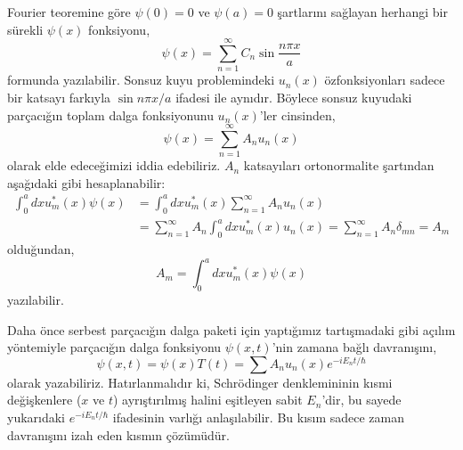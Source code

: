 \documentclass[a4paper,12pt, twoside]{article}
\begin{document}
Fourier teoremine göre $\psi ( 0 ) = 0$ ve $\psi ( a ) = 0$ şartlarını sağlayan herhangi bir sürekli $\psi ( x )$ fonksiyonu,
\begin{equation}
\psi ( x ) = \sum _ { n = 1 } ^ { \infty } C _ { n } \sin \frac { n \pi x } { a }
\end{equation}
formunda yazılabilir. Sonsuz kuyu problemindeki $u_n(x)$ özfonksiyonları sadece bir katsayı farkıyla $\sin n \pi x / a$ ifadesi ile aynıdır. Böylece sonsuz kuyudaki parçacığın toplam dalga fonksiyonunu $u_n(x)$'ler cinsinden,
\begin{equation}
\psi ( x ) = \sum _ { n = 1 } ^ { \infty } A _ { n } u _ { n } ( x )
\end{equation}
olarak elde edeceğimizi iddia edebiliriz. $A_n$ katsayıları ortonormalite şartından aşağıdaki gibi hesaplanabilir:
\begin{equation}
\begin{aligned} \int _ { 0 } ^ { a } d x u _ { m } ^ { * } ( x ) \psi ( x ) & = \int _ { 0 } ^ { a } d x u _ { m } ^ { * } ( x ) \sum _ { n = 1 } ^ { \infty } A _ { n } u _ { n } ( x ) \\ & = \sum _ { n = 1 } ^ { \infty } A _ { n } \int _ { 0 } ^ { a } d x u _ { m } ^ { * } ( x ) u _ { n } ( x ) = \sum _ { n = 1 } ^ { \infty } A _ { n } \delta _ { m n } = A _ { m } \end{aligned}
\end{equation}
olduğundan,
\begin{equation}
A _ { m } = \int _ { 0 } ^ { a } d x u _ { m } ^ { * } ( x ) \psi ( x )
\end{equation}
yazılabilir.

Daha önce serbest parçacığın dalga paketi için yaptığımız tartışmadaki gibi açılım yöntemiyle parçacığın dalga fonksiyonu $\psi(x,t)$'nin zamana bağlı davranışını,
\begin{equation}
\psi ( x , t ) = \psi ( x ) T(t) = \sum A _ { n } u _ { n } ( x ) e ^ { - i E _ { n } t / \hbar }
\end{equation}
olarak yazabiliriz. Hatırlanmalıdır ki, Schrödinger denklemininin kısmi değişkenlere ($x$ ve $t$) ayrıştırılmış halini eşitleyen sabit $E_n$'dir, bu sayede yukarıdaki $e ^ { - i E _ { n } t / \hbar }$ ifadesinin varlığı anlaşılabilir. Bu kısım sadece zaman davranışını izah eden kısmın çözümüdür.
\end{document}
